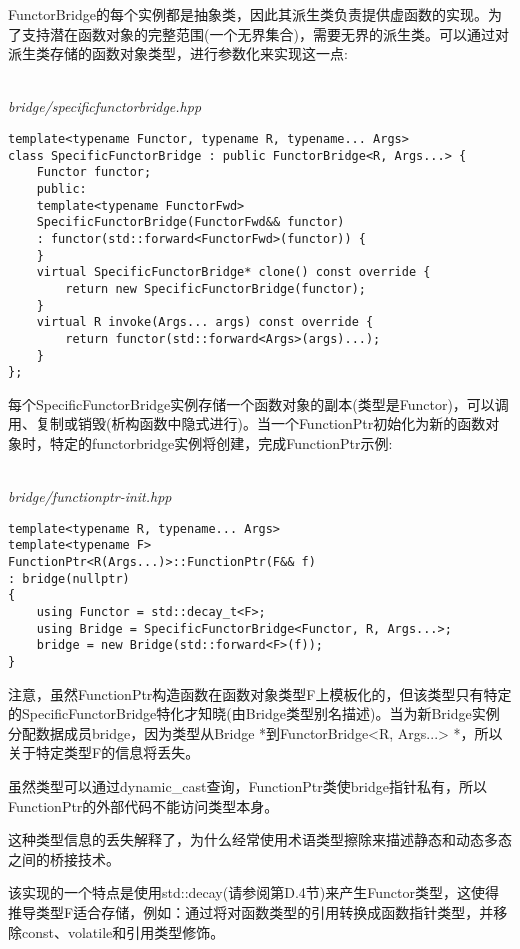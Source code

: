 FunctorBridge的每个实例都是抽象类，因此其派生类负责提供虚函数的实现。为了支持潜在函数对象的完整范围(一个无界集合)，需要无界的派生类。可以通过对派生类存储的函数对象类型，进行参数化来实现这一点:

\hspace*{\fill} \\ %
\noindent
\textit{bridge/specificfunctorbridge.hpp}
\begin{lstlisting}[style=styleCXX]
template<typename Functor, typename R, typename... Args>
class SpecificFunctorBridge : public FunctorBridge<R, Args...> {
	Functor functor;
	public:
	template<typename FunctorFwd>
	SpecificFunctorBridge(FunctorFwd&& functor)
	: functor(std::forward<FunctorFwd>(functor)) {
	}
	virtual SpecificFunctorBridge* clone() const override {
		return new SpecificFunctorBridge(functor);
	}
	virtual R invoke(Args... args) const override {
		return functor(std::forward<Args>(args)...);
	}
};
\end{lstlisting}

每个SpecificFunctorBridge实例存储一个函数对象的副本(类型是Functor)，可以调用、复制或销毁(析构函数中隐式进行)。当一个FunctionPtr初始化为新的函数对象时，特定的functorbridge实例将创建，完成FunctionPtr示例:

\hspace*{\fill} \\ %
\noindent
\textit{bridge/functionptr-init.hpp}
\begin{lstlisting}[style=styleCXX]
template<typename R, typename... Args>
template<typename F>
FunctionPtr<R(Args...)>::FunctionPtr(F&& f)
: bridge(nullptr)
{
	using Functor = std::decay_t<F>;
	using Bridge = SpecificFunctorBridge<Functor, R, Args...>;
	bridge = new Bridge(std::forward<F>(f));
}
\end{lstlisting}

注意，虽然FunctionPtr构造函数在函数对象类型F上模板化的，但该类型只有特定的SpecificFunctorBridge特化才知晓(由Bridge类型别名描述)。当为新Bridge实例分配数据成员bridge，因为类型从Bridge *到FunctorBridge<R, Args...> *，所以关于特定类型F的信息将丢失。

\begin{tcolorbox}[colback=webgreen!5!white,colframe=webgreen!75!black]
\hspace*{0.75cm}虽然类型可以通过dynamic\_cast查询，FunctionPtr类使bridge指针私有，所以FunctionPtr的外部代码不能访问类型本身。
\end{tcolorbox}

这种类型信息的丢失解释了，为什么经常使用术语类型擦除来描述静态和动态多态之间的桥接技术。

该实现的一个特点是使用std::decay(请参阅第D.4节)来产生Functor类型，这使得推导类型F适合存储，例如：通过将对函数类型的引用转换成函数指针类型，并移除const、volatile和引用类型修饰。







































